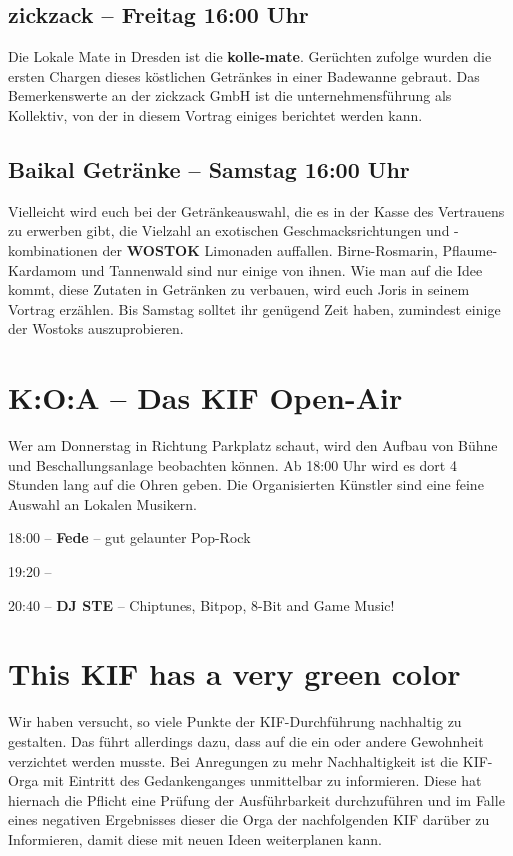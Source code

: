 \subsection*{zickzack -- Freitag 16:00 Uhr}
Die Lokale Mate in Dresden ist die \textbf{kolle-mate}. Gerüchten zufolge wurden die ersten Chargen
dieses köstlichen Getränkes in einer Badewanne gebraut. Das Bemerkenswerte an der zickzack GmbH ist
die unternehmensführung als Kollektiv, von der in diesem Vortrag einiges berichtet werden kann.

\subsection*{Baikal Getränke -- Samstag 16:00 Uhr}
Vielleicht wird euch bei der Getränkeauswahl, die es in der Kasse des Vertrauens zu erwerben gibt,
die Vielzahl an exotischen Geschmacksrichtungen und -kombinationen der \textbf{WOSTOK} Limonaden
auffallen. Birne-Rosmarin, Pflaume-Kardamom und Tannenwald sind nur einige von ihnen. Wie man auf
die Idee kommt, diese Zutaten in Getränken zu verbauen, wird euch Joris in seinem Vortrag erzählen.
Bis Samstag solltet ihr genügend Zeit haben, zumindest einige der Wostoks auszuprobieren.


\section*{K:O:A -- Das KIF Open-Air}
Wer am Donnerstag in Richtung Parkplatz schaut, wird den Aufbau von Bühne und Beschallungsanlage beobachten können.
Ab 18:00 Uhr wird es dort 4 Stunden lang auf die Ohren geben.
Die Organisierten Künstler sind eine feine Auswahl an Lokalen Musikern.

18:00 -- \textbf{Fede} -- gut gelaunter Pop-Rock

19:20 --

20:40 -- \textbf{DJ STE} -- Chiptunes, Bitpop, 8-Bit and Game Music!

\section*{This KIF has a very green color}
Wir haben versucht, so viele Punkte der KIF-Durchführung nachhaltig zu gestalten. Das führt
allerdings dazu, dass auf die ein oder andere Gewohnheit verzichtet werden musste. Bei Anregungen
zu mehr Nachhaltigkeit ist die KIF-Orga mit Eintritt des Gedankenganges unmittelbar zu informieren.
Diese hat hiernach die Pflicht eine Prüfung der Ausführbarkeit durchzuführen und im Falle eines
negativen Ergebnisses dieser die Orga der nachfolgenden KIF darüber zu Informieren, damit diese mit
neuen Ideen weiterplanen kann.


